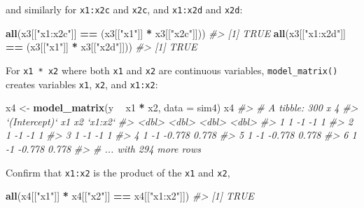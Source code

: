 \documentclass[]{book}
\newenvironment{Shaded}{\begin{snugshade}}{\end{snugshade}}
\newcommand{\CommentTok}[1]{\textcolor[rgb]{0.56,0.35,0.01}{\textit{#1}}}
\newcommand{\DataTypeTok}[1]{\textcolor[rgb]{0.13,0.29,0.53}{#1}}
\newcommand{\KeywordTok}[1]{\textcolor[rgb]{0.13,0.29,0.53}{\textbf{#1}}}
\newcommand{\NormalTok}[1]{#1}
\newcommand{\OperatorTok}[1]{\textcolor[rgb]{0.81,0.36,0.00}{\textbf{#1}}}
\newcommand{\StringTok}[1]{\textcolor[rgb]{0.31,0.60,0.02}{#1}}
\theoremstyle{plain}
\theoremstyle{remark}
\begin{document}
and similarly for \texttt{x1:x2c} and \texttt{x2c}, and \texttt{x1:x2d} and \texttt{x2d}:

\begin{Shaded}
\begin{Highlighting}[]
\KeywordTok{all}\NormalTok{(x3[[}\StringTok{"x1:x2c"}\NormalTok{]] }\OperatorTok{==}\StringTok{ }\NormalTok{(x3[[}\StringTok{"x1"}\NormalTok{]] }\OperatorTok{*}\StringTok{ }\NormalTok{x3[[}\StringTok{"x2c"}\NormalTok{]]))}
\CommentTok{#> [1] TRUE}
\KeywordTok{all}\NormalTok{(x3[[}\StringTok{"x1:x2d"}\NormalTok{]] }\OperatorTok{==}\StringTok{ }\NormalTok{(x3[[}\StringTok{"x1"}\NormalTok{]] }\OperatorTok{*}\StringTok{ }\NormalTok{x3[[}\StringTok{"x2d"}\NormalTok{]]))}
\CommentTok{#> [1] TRUE}
\end{Highlighting}
\end{Shaded}

For \texttt{x1\ *\ x2} where both \texttt{x1} and \texttt{x2} are continuous variables, \texttt{model\_matrix()} creates variables
\texttt{x1}, \texttt{x2}, and \texttt{x1:x2}:

\begin{Shaded}
\begin{Highlighting}[]
\NormalTok{x4 <-}\StringTok{ }\KeywordTok{model_matrix}\NormalTok{(y }\OperatorTok{~}\StringTok{ }\NormalTok{x1 }\OperatorTok{*}\StringTok{ }\NormalTok{x2, }\DataTypeTok{data =}\NormalTok{ sim4)}
\NormalTok{x4}
\CommentTok{#> # A tibble: 300 x 4}
\CommentTok{#>   `(Intercept)`    x1     x2 `x1:x2`}
\CommentTok{#>           <dbl> <dbl>  <dbl>   <dbl>}
\CommentTok{#> 1             1    -1 -1       1    }
\CommentTok{#> 2             1    -1 -1       1    }
\CommentTok{#> 3             1    -1 -1       1    }
\CommentTok{#> 4             1    -1 -0.778   0.778}
\CommentTok{#> 5             1    -1 -0.778   0.778}
\CommentTok{#> 6             1    -1 -0.778   0.778}
\CommentTok{#> # ... with 294 more rows}
\end{Highlighting}
\end{Shaded}

Confirm that \texttt{x1:x2} is the product of the \texttt{x1} and \texttt{x2},

\begin{Shaded}
\begin{Highlighting}[]
\KeywordTok{all}\NormalTok{(x4[[}\StringTok{"x1"}\NormalTok{]] }\OperatorTok{*}\StringTok{ }\NormalTok{x4[[}\StringTok{"x2"}\NormalTok{]] }\OperatorTok{==}\StringTok{ }\NormalTok{x4[[}\StringTok{"x1:x2"}\NormalTok{]])}
\CommentTok{#> [1] TRUE}
\end{Highlighting}
\end{Shaded}
\end{document}
